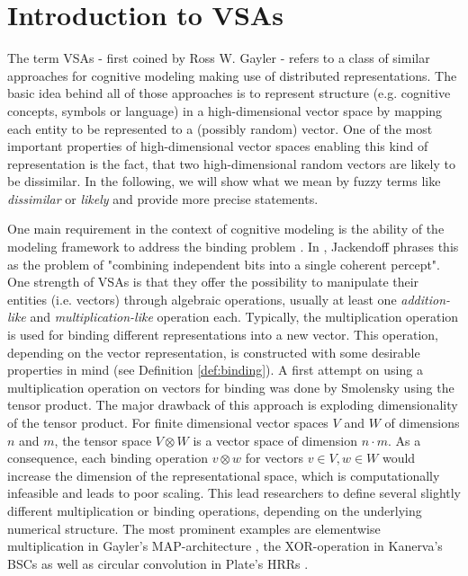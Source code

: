 \chapter{Introduction to \aclp{VSA}}
The term \acfp{VSA} - first coined by Ross W. Gayler \cite{Gayler2003} - refers to a class of similar approaches for cognitive modeling making use of distributed representations.
The basic idea behind all of those approaches is to represent structure (e.g. cognitive concepts, symbols or language) in a high-dimensional vector space by mapping each entity to be represented to a (possibly random) vector.
One of the most important properties of high-dimensional vector spaces enabling this kind of representation is the fact, that two high-dimensional random vectors are likely to be dissimilar.
In the following, we will show what we mean by fuzzy terms like \emph{dissimilar} or \emph{likely} and provide more precise statements.

One main requirement in the context of cognitive modeling is the ability of the modeling framework to address the binding problem \cite{Treisman1999}.
In \cite{Jackendoff2002}, Jackendoff phrases this as the problem of "combining independent bits into a single coherent percept".
One strength of \acp{VSA} is that they offer the possibility to manipulate their entities (i.e. vectors) through algebraic operations, usually at least one \emph{addition-like} and \emph{multiplication-like} operation each.
Typically, the multiplication operation is used for binding different representations into a new vector.
This operation, depending on the vector representation, is constructed with some desirable properties in mind (see Definition \ref{def:binding}).
A first attempt on using a multiplication operation on vectors for binding was done by Smolensky \cite{Smolensky1990} using the tensor product.
The major drawback of this approach is exploding dimensionality of the tensor product.
For finite dimensional vector spaces  $V$ and $W$ of dimensions $n$ and $m$, the tensor space $V \otimes W$ is a vector space of dimension $n\cdot m$.
As a consequence, each binding operation $v\otimes w$ for vectors $v \in V, w \in W$ would increase the dimension of the representational space, which is computationally infeasible and leads to poor scaling.
This lead researchers to define several slightly different multiplication or binding operations, depending on the underlying numerical structure.
The most prominent examples are elementwise multiplication in Gayler's \ac{MAP}-architecture \cite{Gayler1998}, the XOR-operation in Kanerva's \acp{BSC} \cite{Kanerva2000, Kanerva2009} as well as circular convolution in Plate's \acp{HRR} \cite{Plate1991, Plate1994}.

